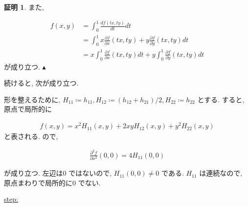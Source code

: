 \documentclass[10pt, fleqn, label-section=none]{bxjsarticle}
\theoremstyle{definition}
\newtheorem*{pf*}{証明}
\renewcommand{\;}{\, ; \,}
\newenvironment{claim}[1]{\par\noindent\underline{step:}\space#1}{}
\newenvironment{claimproof}[1]{\par\noindent{($\because$)}\space#1}{\hfill $\blacktriangle $}
\begin{document}
\begin{pf*}
また, 
\begin{claimproof}
\begin{align*} f(x,y) &= \int_0^1 \frac{df(tx,ty)}{dt} dt \\
& = \int_0^1 x \frac{\partial f}{\partial x} (tx, ty) + y \frac{\partial f}{\partial y} (tx,ty)  dt \\
&= x \int_0^1  \frac{\partial f}{\partial x} (tx, ty)  dt +  y \int_0^1  \frac{\partial f}{\partial y} (tx,ty)  dt   \end{align*}
が成り立つ. 
\end{claimproof}

続けると, 次が成り立つ. 


形を整えるために, $H_{11} \coloneqq h_{11}, H_{12} \coloneqq (h_{12} +h_{21} )/2, H_{22} \coloneqq h_{22} $ とする. すると, 原点で局所的に

\begin{align*} f(x, y ) = x^2 H _{11}(x,y) + 2xy H _{12}(x,y)  + y^2 H _{22}(x,y)  \end{align*}
と表される. ので, 

\begin{align*} \frac{\partial ^2 f}{\partial x^2} (0,0) =  4 H _{11}(0, 0)  \end{align*}

が成り立つ. 左辺は$0$ ではないので, $H _{11}(0, 0) \neq 0 $ である. $H_{11}$ は連続なので, 原点まわりで局所的に$0$ でない. 

\begin{claim}


\end{claim}
\end{pf*}
\end{document}
